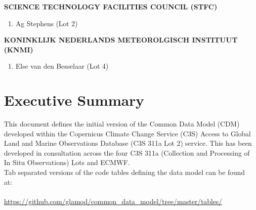 \documentclass[a4paper,12pt]{article}
\begin{document}
\begin{adjustwidth}{2.cm}{}
{\fontsize{14}{17} \selectfont \textbf{\uppercase{Science Technology Facilities Council (STFC)}}}
\begin{enumerate}
\item Ag Stephens (Lot 2)\\
\end{enumerate}

{\fontsize{14}{17} \selectfont \textbf{\uppercase{Koninklijk Nederlands Meteorolgisch Instituut (KNMI)}}}
\begin{enumerate}
\item Else van den Besselaar (Lot 4)
\end{enumerate}

\end{adjustwidth}


\newpage

\section*{Executive Summary}
This document defines the initial version of the Common Data Model (CDM) developed within the Copernicus Climate Change Service (C3S) Access to Global Land and Marine Observations Database (C3S 311a Lot 2) service. This has been developed in consultation across the four C3S 311a (Collection and Processing of In Situ Observations) Lots and ECMWF.\\

Tab separated versions of the code tables defining the data model can be found at:\\ \\
\tabto{2cm} \url{https://github.com/glamod/common_data_model/tree/master/tables/}
\end{document}
